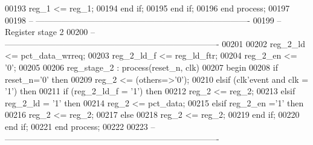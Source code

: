 \begin{DoxyCode}
00193             reg\_1 <= reg\_1;
00194          \textcolor{keywordflow}{end} \textcolor{keywordflow}{if};
00195       \textcolor{keywordflow}{end} \textcolor{keywordflow}{if};
00196    \textcolor{keywordflow}{end} \textcolor{keywordflow}{process};
00197    
00198 \textcolor{keyword}{-- ----------------------------------------------------------------------------}
00199 \textcolor{keyword}{-- Register stage 2}
00200 \textcolor{keyword}{-- ----------------------------------------------------------------------------  }
00201    
00202 reg\_2\_ld <= pct\_data\_wrreq;
00203 reg\_2\_ld\_f <= reg\_ld\_ftr;
00204 reg\_2\_en <= '0';
00205    
00206  reg\_stage\_2 :  \textcolor{keywordflow}{process}(reset_n, clk)
00207 \textcolor{vhdlkeyword}{   begin}
00208       \textcolor{keywordflow}{if} \textcolor{vhdlchar}{reset_n}\textcolor{vhdlchar}{=}\textcolor{vhdlchar}{'}\textcolor{vhdllogic}{}\textcolor{vhdllogic}{0}\textcolor{vhdlchar}{'} \textcolor{keywordflow}{then}
00209          reg\_2 <= (others=>'0');
00210       \textcolor{keywordflow}{elsif} \textcolor{vhdlchar}{(}\textcolor{vhdlchar}{clk}\textcolor{vhdlchar}{'}\textcolor{vhdlkeyword}{event} \textcolor{keywordflow}{and} \textcolor{vhdlchar}{clk} \textcolor{vhdlchar}{=} \textcolor{vhdlchar}{'}\textcolor{vhdllogic}{}\textcolor{vhdllogic}{1}\textcolor{vhdlchar}{'}\textcolor{vhdlchar}{)} \textcolor{keywordflow}{then}
00211             \textcolor{keywordflow}{if} \textcolor{vhdlchar}{(}\textcolor{vhdlchar}{reg_2_ld_f} \textcolor{vhdlchar}{=} \textcolor{vhdlchar}{'}\textcolor{vhdllogic}{}\textcolor{vhdllogic}{1}\textcolor{vhdlchar}{'}\textcolor{vhdlchar}{)} \textcolor{keywordflow}{then}
00212                 reg\_2 <= reg\_2;
00213          \textcolor{keywordflow}{elsif} \textcolor{vhdlchar}{reg_2_ld} \textcolor{vhdlchar}{=} \textcolor{vhdlchar}{'}\textcolor{vhdllogic}{}\textcolor{vhdllogic}{1}\textcolor{vhdlchar}{'} \textcolor{keywordflow}{then} 
00214             reg\_2 <= pct\_data;          
00215          \textcolor{keywordflow}{elsif} \textcolor{vhdlchar}{reg_2_en} \textcolor{vhdlchar}{=}\textcolor{vhdlchar}{'}\textcolor{vhdllogic}{}\textcolor{vhdllogic}{1}\textcolor{vhdlchar}{'} \textcolor{keywordflow}{then} 
00216             reg\_2 <= reg\_2;
00217          \textcolor{keywordflow}{else} 
00218             reg\_2 <= reg\_2;
00219          \textcolor{keywordflow}{end} \textcolor{keywordflow}{if};
00220       \textcolor{keywordflow}{end} \textcolor{keywordflow}{if};
00221    \textcolor{keywordflow}{end} \textcolor{keywordflow}{process};
00222    
00223 \textcolor{keyword}{-- ----------------------------------------------------------------------------}

\end{DoxyCode}
